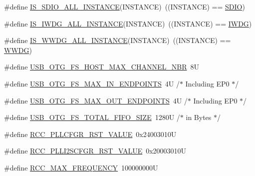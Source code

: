 \begin{DoxyCompactItemize}
\item 
\#define \hyperlink{group___exported__macros_ga73932cb2c83be6be1884d3cba2fc0063}{I\+S\+\_\+\+S\+D\+I\+O\+\_\+\+A\+L\+L\+\_\+\+I\+N\+S\+T\+A\+N\+CE}(I\+N\+S\+T\+A\+N\+CE)~((I\+N\+S\+T\+A\+N\+CE) == \hyperlink{group___peripheral__declaration_ga8149aa2760fffac16bc75216d5fd9331}{S\+D\+IO})
\item 
\#define \hyperlink{group___exported__macros_gad9ec4c52f0572ee67d043e006f1d5e39}{I\+S\+\_\+\+I\+W\+D\+G\+\_\+\+A\+L\+L\+\_\+\+I\+N\+S\+T\+A\+N\+CE}(I\+N\+S\+T\+A\+N\+CE)~((I\+N\+S\+T\+A\+N\+CE) == \hyperlink{group___peripheral__declaration_gad16b79dd94ee85d261d08a8ee94187e7}{I\+W\+DG})
\item 
\#define \hyperlink{group___exported__macros_gac2a8aaec233e19987232455643a04d6f}{I\+S\+\_\+\+W\+W\+D\+G\+\_\+\+A\+L\+L\+\_\+\+I\+N\+S\+T\+A\+N\+CE}(I\+N\+S\+T\+A\+N\+CE)~((I\+N\+S\+T\+A\+N\+CE) == \hyperlink{group___peripheral__declaration_ga9821fd01757986612ddb8982e2fe27f1}{W\+W\+DG})
\item 
\#define \hyperlink{group___exported__macros_ga4c58971ce9062c1c7bc42e1c7ea4df32}{U\+S\+B\+\_\+\+O\+T\+G\+\_\+\+F\+S\+\_\+\+H\+O\+S\+T\+\_\+\+M\+A\+X\+\_\+\+C\+H\+A\+N\+N\+E\+L\+\_\+\+N\+BR}~8U
\item 
\#define \hyperlink{group___exported__macros_gaccec7ca403e63ea963c363ceb7301ca6}{U\+S\+B\+\_\+\+O\+T\+G\+\_\+\+F\+S\+\_\+\+M\+A\+X\+\_\+\+I\+N\+\_\+\+E\+N\+D\+P\+O\+I\+N\+TS}~4\+U    /$\ast$ Including E\+P0 $\ast$/
\item 
\#define \hyperlink{group___exported__macros_ga1d58ab8276cfdef9aa868bfdd2590aae}{U\+S\+B\+\_\+\+O\+T\+G\+\_\+\+F\+S\+\_\+\+M\+A\+X\+\_\+\+O\+U\+T\+\_\+\+E\+N\+D\+P\+O\+I\+N\+TS}~4\+U    /$\ast$ Including E\+P0 $\ast$/
\item 
\#define \hyperlink{group___exported__macros_ga1e726d88af0f77cb8a49ff7b666fd990}{U\+S\+B\+\_\+\+O\+T\+G\+\_\+\+F\+S\+\_\+\+T\+O\+T\+A\+L\+\_\+\+F\+I\+F\+O\+\_\+\+S\+I\+ZE}~1280\+U /$\ast$ in Bytes $\ast$/
\item 
\#define \hyperlink{group___exported__macros_gab0a3c8475d96f7bb0c8a6b8a7e0c943c}{R\+C\+C\+\_\+\+P\+L\+L\+C\+F\+G\+R\+\_\+\+R\+S\+T\+\_\+\+V\+A\+L\+UE}~0x24003010U
\item 
\#define \hyperlink{group___exported__macros_gab5ca7e3fcb49274bb60c660221bbca5b}{R\+C\+C\+\_\+\+P\+L\+L\+I2\+S\+C\+F\+G\+R\+\_\+\+R\+S\+T\+\_\+\+V\+A\+L\+UE}~0x20003010U
\item 
\#define \hyperlink{group___exported__macros_ga08aeea283003a2c787227347087b5b1f}{R\+C\+C\+\_\+\+M\+A\+X\+\_\+\+F\+R\+E\+Q\+U\+E\+N\+CY}~100000000U

\end{DoxyCompactItemize}
